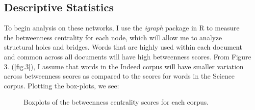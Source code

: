 \documentclass[12pt]{article}
\begin{document}
\subsection{Descriptive Statistics}

To begin analysis on these networks, I use the \textit{igraph} package in R to measure the betweenness centrality for each node, which will allow me to analyze structural holes and bridges. Words that are highly used within each document and common across all documents will have high betweenness scores. From Figure 3. (\ref{fig.3}), I assume that words in the Indeed corpus will have smaller variation across betweenness scores as compared to the scores for words in the Science corpus. Plotting the box-plots, we see: 
\vspace{2mm}
\begin{figure}[H]
	\hfill
	\hfill
	\hfill
	\caption{Boxplots of the betweenness centrality scores for each corpus.}
\end{figure}
\vspace{2mm}
\end{document}
